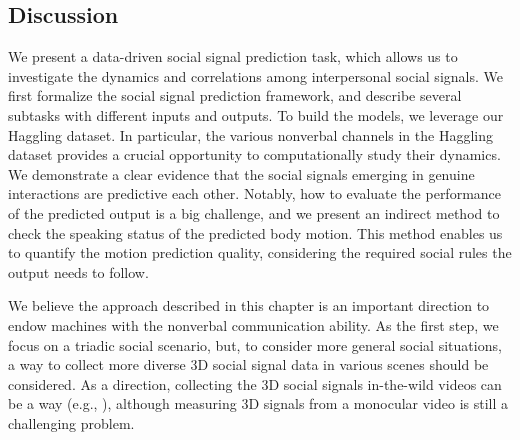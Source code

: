 





\subsection{Discussion}
We present a data-driven social signal prediction task, which allows us to investigate the dynamics and correlations among interpersonal social signals. We first formalize the social signal prediction framework, and describe several subtasks with different inputs and outputs. To build the models, we leverage our Haggling dataset. In particular, the various nonverbal channels in the Haggling dataset provides a crucial opportunity to computationally study their dynamics. We demonstrate a clear evidence that the social signals emerging in genuine interactions are predictive each other. Notably, how to evaluate the performance of the predicted output is a big challenge, and we present an indirect method to check the speaking status of the predicted body motion. This method enables us to quantify the motion prediction quality, considering the required social rules the output needs to follow. 

We believe the approach described in this chapter is an important direction to endow machines with the nonverbal communication ability. As the first step, we focus on a triadic social scenario, but, to consider more general social situations, a way to collect more diverse 3D social signal data in various scenes should be considered. As a direction, collecting the 3D social signals in-the-wild videos can be a way (e.g., \cite{Xiang2019}), although measuring 3D signals from a monocular video is still a challenging problem.
